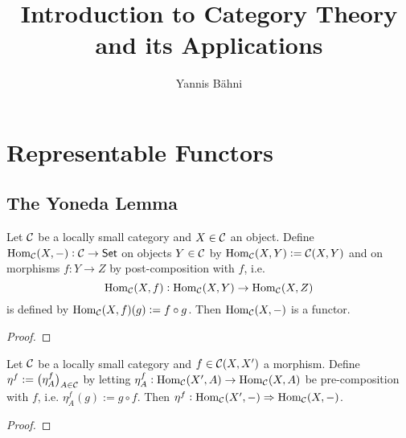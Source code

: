 

\title{Introduction to Category Theory and its Applications}
\author{Yannis B\"{a}hni}
\address[Yannis B\"{a}hni]{University of Zurich, R\"{a}mistrasse 71, 8006 Zurich}



\maketitle

\tableofcontents

\section{Representable Functors}
\subsection{The Yoneda Lemma}

\begin{proposition}
	Let $\mathcal{C}$ be a locally small category and $X \in \mathcal{C}$ an object. Define $\operatorname{Hom}_{\mathcal{C}}(X,-) : \mathcal{C} \to \mathsf{Set}$ on objects $Y \in \mathcal{C}$ by $\operatorname{Hom}_{\mathcal{C}}(X,Y) := \mathcal{C}(X,Y)$ and on morphisms $f : Y \to Z$ by post-composition with $f$, i.e. 
	\begin{equation*}
		\operatorname{Hom}_{\mathcal{C}}(X,f) : \operatorname{Hom}_{\mathcal{C}}(X,Y) \to \operatorname{Hom}_{\mathcal{C}}(X,Z)
	\end{equation*}
	\noindent is defined by $\operatorname{Hom}_{\mathcal{C}}(X,f)(g) := f \circ g$. Then $\operatorname{Hom}_{\mathcal{C}}(X,-)$ is a functor.
\end{proposition}

\begin{proof}
	
\end{proof}

\begin{proposition}
	Let $\mathcal{C}$ be a locally small category and $f \in \mathcal{C}(X,X')$ a morphism. Define $\eta^f := \del[1]{\eta_A^f}_{A \in \Ccal}$ by letting $\eta^f_A : \operatorname{Hom}_{\mathcal{C}}(X',A) \to \operatorname{Hom}_{\mathcal{C}}(X,A)$ be pre-composition with $f$, i.e. $\eta_A^f(g) := g \circ f$. Then $\eta^f : \operatorname{Hom}_{\mathcal{C}}(X',-) \Rightarrow \operatorname{Hom}_{\mathcal{C}}(X,-)$.
\end{proposition}

\begin{proof}
	
\end{proof}

